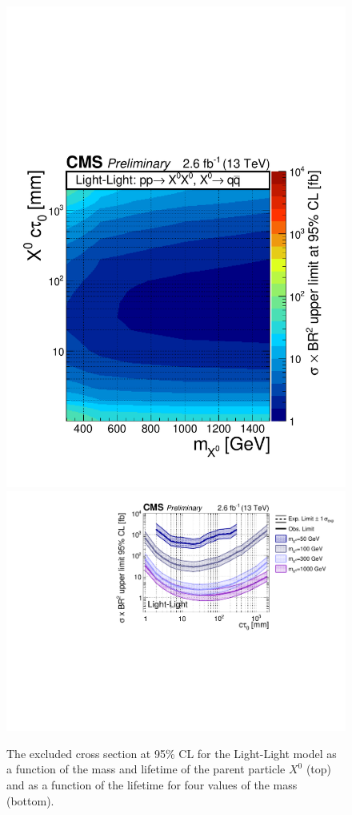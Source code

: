 \begin{figure}[tb]
\begin{center}
\includegraphics[width=.75\textwidth]{figures/pas//RESULT/UNBLINDED_LIMITS/Light-Light2D.pdf}
\includegraphics[width=.85\textwidth]{figures/pas//RESULT/UNBLINDED_LIMITS/Light-Light.pdf}
\caption{The excluded cross section at 95\% CL for the Light-Light
  model as a function of the mass and lifetime of the parent particle
  $X^0$ (top) and as a function of the lifetime for four values of the
  mass (bottom).\label{fig:light_limit}}
\end{center}
\end{figure}

